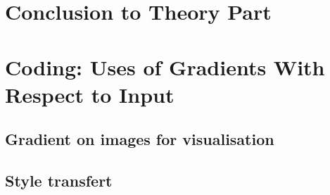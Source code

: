 \documentclass[11pt,english]{article}
\begin{document}
    \pagebreak
    \section{Conclusion to Theory Part}

    \pagebreak
    \section{Coding: Uses of Gradients With Respect to Input}
    \subsection{Gradient on images for visualisation}
    

    \pagebreak
    \subsection{Style transfert}
    
\end{document}
